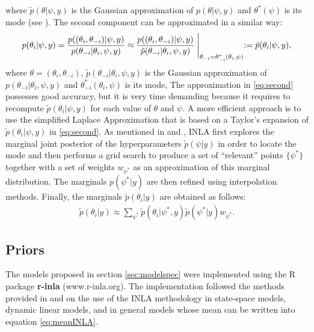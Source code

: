 \documentclass[12pt]{amsart}
\theoremstyle{plain}
\theoremstyle{definition}
\theoremstyle{remark}
\newcommand{\jeg}[1]{\color{ProcessBlue}\textbf{[JEG: #1]}\normalcolor}
\begin{document}
where $\tilde p(\theta|\psi,y)$ is the Gaussian approximation of
$p(\theta|\psi,y)$ and $\theta^*(\psi)$ is its mode (see \cite{Rue2009}). The
second component can be approximated in a similar way:
\begin{equation}\label{eq:second}
  p(\theta_i|\psi,y)  =\frac{p((\theta_i,\theta_{-i})|\psi,y)}{p(\theta_{-i}|\theta_i,\psi,y)} %
   \approx \frac{p((\theta_i,\theta_{-i})|\psi,y)}{\tilde p(\theta_{-i}|\theta_i,\psi,y)} \Biggm |_{\theta_{-i}=\theta_{-i}^*(\theta_i,\psi)}:=\tilde p(\theta_i|\psi,y),
\end{equation}
where $\theta=(\theta_i,\theta_{-i})$, $\tilde p(\theta_{-i}|\theta_i,\psi,y)$ is the Gaussian approximation of
$p(\theta_{-i}|\theta_i,\psi,y)$ and $\theta_{-i}^*(\theta_i,\psi)$ is its mode,  
The approximation in \eqref{eq:second} possesses good accuracy, but it is very time demanding because it
requires to recompute $\tilde p(\theta_i|\psi,y)$ for each value of $\theta$ and $\psi$. A
more efficient approach is to use the simplified Laplace Approximation that is
based on a Taylor's expansion of $\tilde p(\theta_i|\psi,y)$ in 
\eqref{eq:second}. As mentioned in \cite{Rue2009} and \cite{Blangiardo2013},
INLA first explores the marginal joint posterior of the hyperparameters $\tilde
p(\psi | y)$ in order to locate the mode and then performs a grid search to 
produce a set of ``relevant'' points $\{\psi^*\}$ together with a set of weights
$w_{\psi^*}$ as an approximation of this marginal distribution. The marginals
$p(\psi^*|y)$ are then refined using interpolation methods. Finally, the marginals
$\tilde p(\theta_i|y)$ are obtained as follows:
\begin{align*}
  \tilde p(\theta_i|y) \approx \sum_{\psi^*}\tilde p(\theta_i|\psi^*,y)\tilde p(\psi^*|y)w_{\psi^*}.
\end{align*}

\subsection{Priors}
The models proposed in section \ref{sec:modelspec} were
implemented using the R package \textbf{r-inla} (www.r-inla.org). The
implementation followed the methods provided in \cite{Ruiz-Cardenas2012} and
\cite{Muff2015} on the use of the INLA methodology in state-space models,
dynamic linear models, and in general models whose mean can be written
into equation \eqref{eq:meanINLA}.

\end{document}
